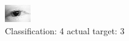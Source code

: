 \begin{figure}[h!]
\begin{center}
\includegraphics[width=0.60\columnwidth]{figures/ID131_class_4_target_3.png}
\end{center}
\caption{ Classification: 4 actual target: 3}
\label{fig:ID131_class_4_target_3}
\end{figure}
